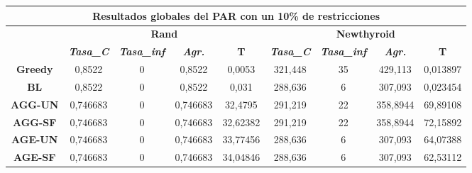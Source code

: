 \documentclass[12pt, spanish]{article}
\begin{document}
\begin{table}[H]
\footnotesize
\begin{tabular}{|c|c|c|c|c|c|c|c|c|}
\hline
\multicolumn{9}{|c|}{\textbf{Resultados globales del PAR con un 10\% de restricciones}}                                                                                                                                  \\ \hline
\multirow{2}{*}{}        & \multicolumn{4}{c|}{\textbf{Rand}}                                                            & \multicolumn{4}{c|}{\textbf{Newthyroid}}                                                      \\ \cline{2-9} 
                         & \textit{\textbf{Tasa\_C}} & \textit{\textbf{Tasa\_inf}} & \textit{\textbf{Agr.}} & \textbf{T} & \textit{\textbf{Tasa\_C}} & \textit{\textbf{Tasa\_inf}} & \textit{\textbf{Agr.}} & \textbf{T} \\ \hline
\textbf{Greedy}          & 0,8522                    & 0                           & 0,8522                 & 0,0053     & 321,448                   & 35                          & 429,113                & 0,013897   \\ \hline
\textbf{BL}              & 0,8522                    & 0                           & 0,8522                 & 0,031      & 288,636                   & 6                           & 307,093                & 0,023454   \\ \hline
\textbf{AGG-UN}          & 0,746683                  & 0                           & 0,746683               & 32,4795    & 291,219                   & 22                          & 358,8944               & 69,89108   \\ \hline
\textbf{AGG-SF}          & 0,746683                  & 0                           & 0,746683               & 32,62382   & 291,219                   & 22                          & 358,8944               & 72,15892   \\ \hline
\textbf{AGE-UN}          & 0,746683                  & 0                           & 0,746683               & 33,77456   & 288,636                   & 6                           & 307,093                & 64,07388   \\ \hline
\textbf{AGE-SF}          & 0,746683                  & 0                           & 0,746683               & 34,04846   & 288,636                   & 6                           & 307,093                & 62,53112   \\ \hline

\end{tabular}
\end{table}
\end{document}
